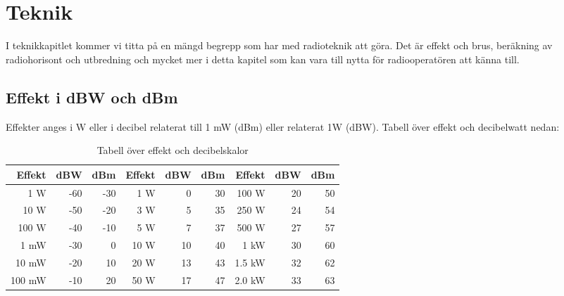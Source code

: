 
\chapter{Teknik}

I teknikkapitlet kommer vi titta på en mängd begrepp som har med radioteknik
att göra. Det är effekt och brus, beräkning av radiohorisont och utbredning
och mycket mer i detta kapitel som kan vara till nytta för radiooperatören att
känna till.

\clearpage

\section{Effekt i dBW och dBm}

Effekter anges i W eller i decibel relaterat till 1 mW (dBm) eller relaterat
1W (dBW). Tabell över effekt och decibelwatt nedan:

\begin{table}[H]
\centering
\begin{tabular}{rrr|rrr|rrr}
	\textbf{Effekt} & \textbf{dBW} & \textbf{dBm} & \textbf{Effekt} & \textbf{dBW} & \textbf{dBm} & \textbf{Effekt} & \textbf{dBW} & \textbf{dBm} \\ \hline
	    1 \textmu W &          -60 &          -30 &             1 W &            0 &           30 &           100 W &           20 &           50 \\
	   10 \textmu W &          -50 &          -20 &             3 W &            5 &           35 &           250 W &           24 &           54 \\
	  100 \textmu W &          -40 &          -10 &             5 W &            7 &           37 &           500 W &           27 &           57 \\
	           1 mW &          -30 &            0 &            10 W &           10 &           40 &            1 kW &           30 &           60 \\
	          10 mW &          -20 &           10 &            20 W &           13 &           43 &          1.5 kW &           32 &           62 \\
	         100 mW &          -10 &           20 &            50 W &           17 &           47 &          2.0 kW &           33 &           63
\end{tabular}
\caption{Tabell över effekt och decibelskalor}
\end{table}

